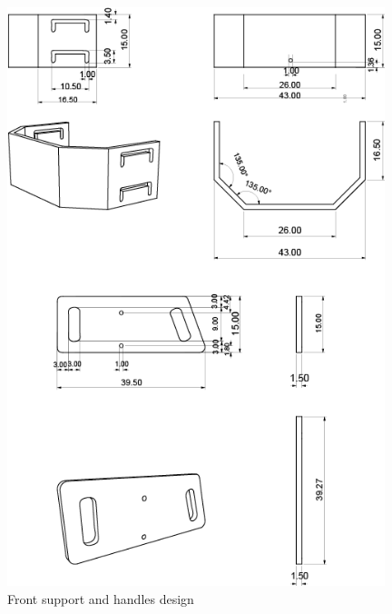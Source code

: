 \begin{figure}[h]
\centering
\includegraphics[width=11cm]{images/DesenhoTecnicoApoio.png}
\caption{Front support and handles design}
\label{fig:frontsupport}
\end{figure}

